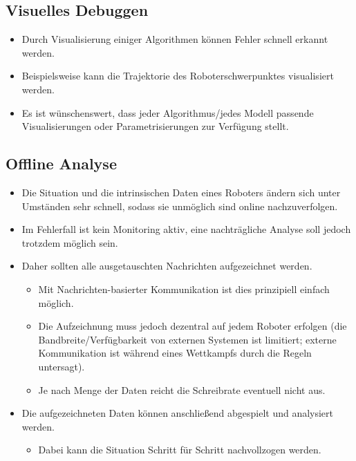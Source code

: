 		\subsection{Visuelles Debuggen}
			\begin{itemize}
				\item Durch Visualisierung einiger Algorithmen können Fehler schnell erkannt werden.
				\item Beispielsweise kann die Trajektorie des Roboterschwerpunktes visualisiert werden.
				\item Es ist wünschenswert, dass jeder Algorithmus/jedes Modell passende Visualisierungen oder Parametrisierungen zur Verfügung stellt.
			\end{itemize}

		\subsection{Offline Analyse}
			\begin{itemize}
				\item Die Situation und die intrinsischen Daten eines Roboters ändern sich unter Umständen sehr schnell, sodass sie \ggf unmöglich sind online nachzuverfolgen.
				\item Im Fehlerfall ist \mglw kein Monitoring aktiv, eine nachträgliche Analyse soll jedoch trotzdem möglich sein.
				\item Daher sollten alle ausgetauschten Nachrichten aufgezeichnet werden.
					\begin{itemize}
						\item Mit Nachrichten-basierter Kommunikation ist dies prinzipiell einfach möglich.
						\item Die Aufzeichnung muss jedoch dezentral auf jedem Roboter erfolgen (die Bandbreite/Verfügbarkeit von externen Systemen ist limitiert; externe Kommunikation ist während eines Wettkampfs \mglw durch die Regeln untersagt).
						\item Je nach Menge der Daten reicht die Schreibrate eventuell nicht aus.
					\end{itemize}
				\item Die aufgezeichneten Daten können anschließend abgespielt und analysiert werden.
					\begin{itemize}
						\item Dabei kann die Situation Schritt für Schritt nachvollzogen werden.
					\end{itemize}
			\end{itemize}

